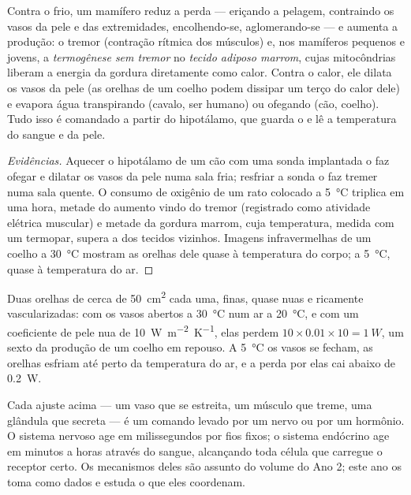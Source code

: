 \begin{proposition}\label{prop:b1:mammal-organization:thermoreg}
Contra o frio, um mamífero reduz a perda --- eriçando a pelagem,
contraindo os vasos da pele e das extremidades, encolhendo-se,
aglomerando-se --- e aumenta a produção: o tremor (contração rítmica dos
músculos) e, nos mamíferos pequenos e jovens, a
\emph{termogênese sem tremor} no
\emph{tecido adiposo marrom}, cujas
mitocôndrias liberam a energia da gordura diretamente como calor. Contra
o calor, ele dilata os vasos da pele (as orelhas de um coelho podem
dissipar um terço do calor dele) e evapora água transpirando (cavalo,
ser humano) ou ofegando (cão, coelho). Tudo isso é comandado a partir do
hipotálamo, que guarda o  e lê a temperatura do
sangue e da pele.
\end{proposition}
\begin{proof}[Evidências]
Aquecer o hipotálamo de um cão com uma sonda implantada o faz ofegar e
dilatar os vasos da pele numa sala fria; resfriar a sonda o faz tremer
numa sala quente. O consumo de oxigênio de um rato colocado a
\qty{5}{\celsius} triplica em uma hora, metade do aumento vindo do
tremor (registrado como atividade elétrica muscular) e metade da gordura
marrom, cuja temperatura, medida com um termopar, supera a dos tecidos
vizinhos. Imagens infravermelhas de um coelho a \qty{30}{\celsius}
mostram as orelhas dele quase à temperatura do corpo; a
\qty{5}{\celsius}, quase à temperatura do ar.
\end{proof}

\begin{example}\label{ex:b1:mammal-organization:ears}
Duas orelhas de cerca de \qty{50}{cm^2} cada uma, finas, quase nuas e
ricamente vascularizadas: com os vasos abertos a \qty{30}{\celsius} num
ar a \qty{20}{\celsius}, e com um coeficiente de pele nua de
\qty{10}{W.m^{-2}.K^{-1}}, elas perdem $10\times 0.01\times 10 =
\qty{1}{W}$, um sexto da produção de um coelho em repouso. A
\qty{5}{\celsius} os vasos se fecham, as orelhas esfriam até perto da
temperatura do ar, e a perda por elas cai abaixo de \qty{0.2}{W}.
\end{example}

\begin{remark}[Coordenação]\label{rem:b1:mammal-organization:coordination}
Cada ajuste acima --- um vaso que se estreita, um músculo que treme, uma
glândula que secreta --- é um comando levado por um nervo ou por um
hormônio. O sistema nervoso age em milissegundos por fios fixos; o
sistema endócrino age em minutos a horas através do sangue, alcançando
toda célula que carregue o receptor certo. Os mecanismos deles são
assunto do volume do Ano 2; este ano os toma como dados e estuda o que
eles coordenam.
\end{remark}


